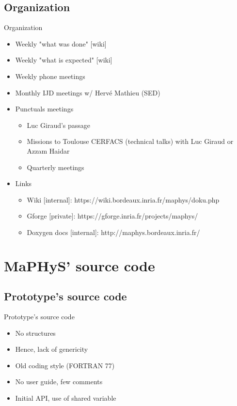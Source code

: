\documentclass[slideopt,A4]{beamer}
\begin{document}
%
\subsection{Organization}
\begin{frame}{Organization}
\begin{itemize}
\item Weekly "what was done" [wiki]
\item Weekly "what is expected" [wiki]
\item Weekly phone meetings
\pause
\item Monthly IJD meetings w/ Hervé Mathieu (SED)
\pause
\item Punctuals meetings 
  \begin{itemize}
  \item Luc Giraud's passage
  \item Missions to Toulouse CERFACS (technical talks) with Luc Giraud or Azzam Haidar
  \item Quarterly meetings
  \end{itemize}
\pause
\item Links
  \begin{itemize}
  \item Wiki [internal]: https://wiki.bordeaux.inria.fr/maphys/doku.php
  \item Gforge [private]: https://gforge.inria.fr/projects/maphys/
  \item Doxygen docs [internal]: http://maphys.bordeaux.inria.fr/
  \end{itemize}
\end{itemize}


\end{frame}

%
\section{MaPHyS' source code}
\subsection{Prototype's source code}
\begin{frame}{Prototype's source code}
\begin{minipage}{0.42 \textwidth}
\begin{itemize}
  \item No structures
  \item Hence, lack of genericity
  \item Old coding style (FORTRAN 77)
  \item No user guide, few comments
  \item Initial API, use of shared variable 
\end{itemize}
\end{minipage}
\end{frame}
%
\end{document}
